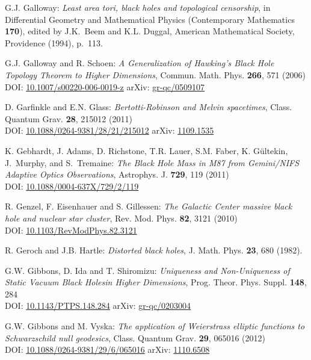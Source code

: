 \begin{thebibliography}{123}
G.J. Galloway:
{\em Least area tori, black holes and topological censorship},
in {\rm Differential Geometry and Mathematical Physics}
(Contemporary Mathematics {\bf 170}),
edited by  J.K.~Beem and K.L. Duggal,
American Mathematical Society, Providence (1994), p.~113.

G.J. Galloway and R. Schoen:
{\em A Generalization of Hawking’s Black Hole Topology Theorem to Higher Dimensions},
Commun. Math. Phys. {\bf 266}, 571 (2006)\\
DOI: \href{https://doi.org/10.1007/s00220-006-0019-z}{10.1007/s00220-006-0019-z}\hfill
arXiv: \href{https://arxiv.org/abs/gr-qc/0509107}{gr-qc/0509107}

D. Garfinkle and E.N. Glass:
{\em Bertotti-Robinson and Melvin spacetimes},
Class. Quantum Grav. {\bf 28}, 215012 (2011)\\
DOI: \href{https://doi.org/10.1088/0264-9381/28/21/215012}{10.1088/0264-9381/28/21/215012}\hfill
arXiv: \href{https://arxiv.org/abs/1109.1535}{1109.1535}

K. Gebhardt, J. Adams, D. Richstone, T.R. Lauer, S.M. Faber, K. Gültekin, J.~Murphy, and S.~Tremaine:
{\em The Black Hole Mass in M87 from Gemini/NIFS Adaptive Optics Observations},
Astrophys. J. {\bf 729}, 119 (2011)\\
DOI: \href{https://doi.org/10.1088/0004-637X/729/2/119}{10.1088/0004-637X/729/2/119}

R. Genzel, F. Eisenhauer and S. Gillessen:
{\em The Galactic Center massive black hole and nuclear star cluster},
Rev. Mod. Phys. {\bf 82}, 3121 (2010)\\
DOI: \href{https://doi.org/10.1103/RevModPhys.82.3121}{10.1103/RevModPhys.82.3121}

R. Geroch and J.B. Hartle:
{\em Distorted black holes},
J. Math. Phys. {\bf 23}, 680 (1982).

G.W. Gibbons, D. Ida and T. Shiromizu:
{\em Uniqueness and Non-Uniqueness of Static Vacuum Black Holesin Higher Dimensions},
Prog. Theor. Phys. Suppl. {\bf 148}, 284\\
DOI: \href{https://doi.org/10.1143/PTPS.148.284}{10.1143/PTPS.148.284}\hfill
arXiv: \href{https://arxiv.org/abs/gr-qc/0203004}{gr-qc/0203004}

G.W. Gibbons and M. Vyska:
{\em The application of Weierstrass elliptic functions to Schwarzschild null geodesics},
Class. Quantum Grav. {\bf 29}, 065016 (2012)\\
DOI: \href{https://doi.org/10.1088/0264-9381/29/6/065016}{10.1088/0264-9381/29/6/065016}\hfill
arXiv: \href{https://arxiv.org/abs/1110.6508}{1110.6508}


\end{thebibliography}
